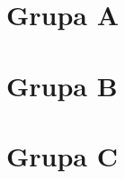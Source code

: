 \newcommand{\letterchapterformat}{
	\titleformat{\chapter}[display]
	{\normalfont\huge\bfseries}{}{0pt}{}
	\titlespacing*{\chapter}{0pt}{0pt}{0pt}

	\renewcommand{\thechapter}{\Alph{chapter}}
	\renewcommand{\thesection}{\thechapter.\arabic{section}}
}

\letterchapterformat

\chapter{Grupa A}


\chapter{Grupa B}


\chapter{Grupa C}

